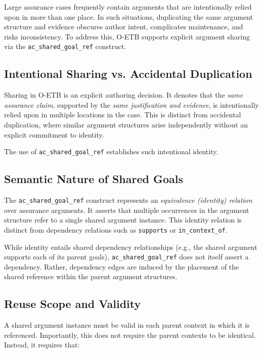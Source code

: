 \documentclass[12pt,twoside,a4paper]{article}
\begin{document}
Large assurance cases frequently contain arguments that are intentionally relied upon in more than one place. In such situations, duplicating the same argument structure and evidence obscures author intent, complicates maintenance, and risks inconsistency. To address this, O-ETB supports explicit argument sharing via the \texttt{ac\_shared\_goal\_ref} construct.

\subsection{Intentional Sharing vs. Accidental Duplication}

Sharing in O-ETB is an explicit authoring decision. It denotes that the \emph{same assurance claim}, supported by the \emph{same justification and evidence}, is intentionally relied upon in multiple locations in the case. This is distinct from accidental duplication, where similar argument structures arise independently without an explicit commitment to identity.

The use of \texttt{ac\_shared\_goal\_ref} establishes such intentional identity.

\subsection{Semantic Nature of Shared Goals}

The \texttt{ac\_shared\_goal\_ref} construct represents an \emph{equivalence (identity) relation} over assurance arguments. It asserts that multiple occurrences in the argument structure refer to a single shared argument instance. This identity relation is distinct from dependency relations such as \texttt{supports} or \texttt{in\_context\_of}.

While identity entails shared dependency relationships (e.g., the shared argument supports each of its parent goals), \texttt{ac\_shared\_goal\_ref} does not itself assert a dependency. Rather, dependency edges are induced by the placement of the shared reference within the parent argument structures.

\subsection{Reuse Scope and Validity}

A shared argument instance must be valid in each parent context in which it is referenced. Importantly, this does not require the parent contexts to be identical. Instead, it requires that:
\end{document}
